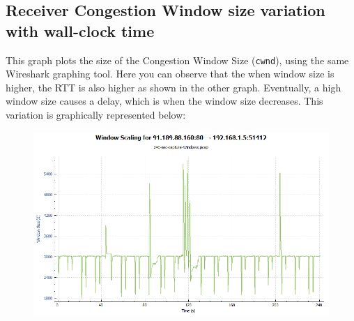 \documentclass{article}
\begin{document}
\subsection{Receiver Congestion Window size variation with wall-clock time}
\begin{flushleft}
This graph plots the size of the Congestion Window Size (\texttt{cwnd}), using the same Wireshark graphing tool. Here you can observe that the when window size is higher, the RTT is also higher as shown in the other graph. Eventually, a high window size causes a delay, which is when the window size decreases. This variation is graphically represented below:
\begin{figure}[H]
\centering
\includegraphics[width=0.55\linewidth]{Window-size-variation-240-sec-capture-Windows.png}
\end{figure}
\end{flushleft}
\end{document}
